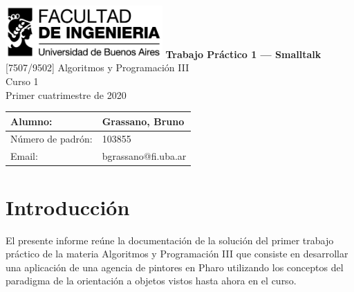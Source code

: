 \documentclass[titlepage,a4paper]{article}
\begin{document}
\begin{titlepage} %
	\hfill\includegraphics[width=6cm]{logofiuba.jpg}
    \centering
    \vfill
    \Huge \textbf{Trabajo Práctico 1 — Smalltalk}
    \vskip2cm
    \Large [7507/9502] Algoritmos y Programación III\\
    Curso 1 \\ %
    Primer cuatrimestre de 2020 
    \vfill
    \begin{tabular}{ | l | l | } %
      \hline
      Alumno: & Grassano, Bruno \\ \hline
      Número de padrón: & 103855 \\ \hline
      Email: & bgrassano@fi.uba.ar \\ \hline
  	\end{tabular}
    \vfill
    \vfill
\end{titlepage}

\tableofcontents %
\newpage




\section{Introducción}\label{sec:intro}
El presente informe reúne la documentación de la solución del primer trabajo práctico de la materia Algoritmos y Programación III que consiste en desarrollar una aplicación de una agencia de pintores en Pharo utilizando los conceptos del paradigma de la orientación a objetos vistos hasta ahora en el curso.


\end{document}
